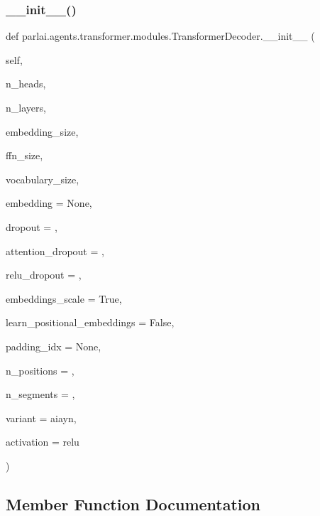 \subsubsection{\texorpdfstring{\+\_\+\+\_\+init\+\_\+\+\_\+()}{\_\_init\_\_()}}
{\footnotesize\ttfamily def parlai.\+agents.\+transformer.\+modules.\+Transformer\+Decoder.\+\_\+\+\_\+init\+\_\+\+\_\+ (\begin{DoxyParamCaption}\item[{}]{self,  }\item[{}]{n\+\_\+heads,  }\item[{}]{n\+\_\+layers,  }\item[{}]{embedding\+\_\+size,  }\item[{}]{ffn\+\_\+size,  }\item[{}]{vocabulary\+\_\+size,  }\item[{}]{embedding = {\ttfamily None},  }\item[{}]{dropout = {},  }\item[{}]{attention\+\_\+dropout = {},  }\item[{}]{relu\+\_\+dropout = {},  }\item[{}]{embeddings\+\_\+scale = {\ttfamily True},  }\item[{}]{learn\+\_\+positional\+\_\+embeddings = {\ttfamily False},  }\item[{}]{padding\+\_\+idx = {\ttfamily None},  }\item[{}]{n\+\_\+positions = {},  }\item[{}]{n\+\_\+segments = {},  }\item[{}]{variant = {\ttfamily \textquotesingle{}aiayn\textquotesingle{}},  }\item[{}]{activation = {\ttfamily \textquotesingle{}relu\textquotesingle{}} }\end{DoxyParamCaption})}



\subsection{Member Function Documentation}
\mbox{\label{classparlai_1_1agents_1_1transformer_1_1modules_1_1TransformerDecoder_a19b2e9eecef1384bcfa9f772cac24a20}} 
